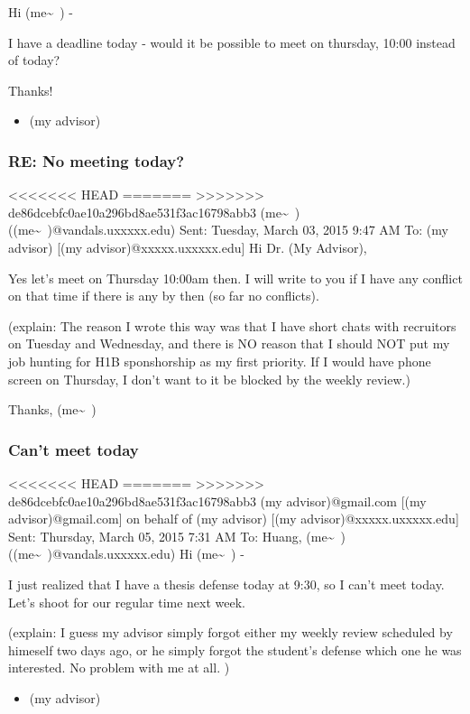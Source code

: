 \documentclass[9pt,b5paper]{article}
\begin{document}
Hi (me\textasciitilde{}~) - 

I have a deadline today - would it be possible to meet on thursday, 10:00 instead of today?

Thanks!

\begin{itemize}
\item (my advisor)
\end{itemize}
\subsubsection{RE: No meeting today?}
<<<<<<< HEAD
\label{sec-3-3-2}
=======
\label{sec-2-3-2}
>>>>>>> de86dcebfc0ae10a296bd8ae531f3ac16798abb3
(me\textasciitilde{}~) ((me\textasciitilde{}~)@vandals.uxxxxx.edu)
Sent:        Tuesday, March 03, 2015 9:47 AM
To:        
(my advisor) [(my advisor)@xxxxx.uxxxxx.edu]
Hi Dr. (My Advisor), 

Yes let's meet on Thursday 10:00am then. I will write to you if I have any conflict on that time if there is any by then (so far no conflicts). 

(explain: The reason I wrote this way was that I have short chats with recruitors on Tuesday and Wednesday, and there is NO reason that I should NOT put my job hunting for H1B sponshorship as my first priority. If I would have phone screen on Thursday, I don't want to it be blocked by the weekly review.)

Thanks,
(me\textasciitilde{}~)
\subsubsection{Can't meet today}
<<<<<<< HEAD
\label{sec-3-3-3}
=======
\label{sec-2-3-3}
>>>>>>> de86dcebfc0ae10a296bd8ae531f3ac16798abb3
(my advisor)@gmail.com [(my advisor)@gmail.com] on behalf of (my advisor) [(my advisor)@xxxxx.uxxxxx.edu]
Sent:        Thursday, March 05, 2015 7:31 AM
To:        
Huang, (me\textasciitilde{}~) ((me\textasciitilde{}~)@vandals.uxxxxx.edu)
Hi (me\textasciitilde{}~) - 

I just realized that I have a thesis defense today at 9:30, so I can't meet today. Let's shoot for our regular time next week.

(explain: I guess my advisor simply forgot either my weekly review scheduled by himeself two days ago, or he simply forgot the student's defense which one he was interested. No problem with me at all. )

\begin{itemize}
\item (my advisor)
\end{itemize}
\end{document}
